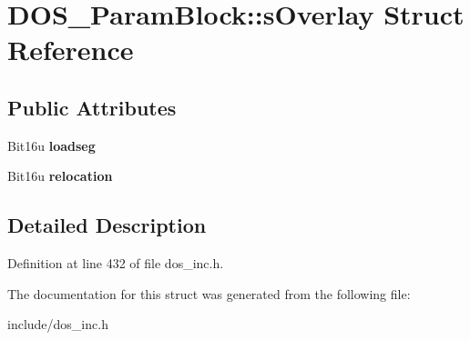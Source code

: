 \hypertarget{structDOS__ParamBlock_1_1sOverlay}{\section{D\-O\-S\-\_\-\-Param\-Block\-:\-:s\-Overlay Struct Reference}
\label{structDOS__ParamBlock_1_1sOverlay}
}
\subsection*{Public Attributes}
\begin{DoxyCompactItemize}
\item 
\hypertarget{structDOS__ParamBlock_1_1sOverlay_a6aa3b07fbae37d952b116773e87712cc}{Bit16u {\bfseries loadseg}}\label{structDOS__ParamBlock_1_1sOverlay_a6aa3b07fbae37d952b116773e87712cc}

\item 
\hypertarget{structDOS__ParamBlock_1_1sOverlay_a1fec335c736328ce8eb8096a2df9ccc6}{Bit16u {\bfseries relocation}}\label{structDOS__ParamBlock_1_1sOverlay_a1fec335c736328ce8eb8096a2df9ccc6}

\end{DoxyCompactItemize}


\subsection{Detailed Description}


Definition at line 432 of file dos\-\_\-inc.\-h.



The documentation for this struct was generated from the following file\-:\begin{DoxyCompactItemize}
\item 
include/dos\-\_\-inc.\-h\end{DoxyCompactItemize}
